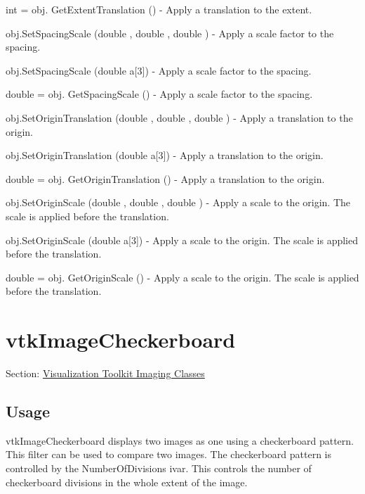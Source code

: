 \begin{DoxyItemize}
\item {\ttfamily int = obj. Get\-Extent\-Translation ()} -\/ Apply a translation to the extent.  
\item {\ttfamily obj.\-Set\-Spacing\-Scale (double , double , double )} -\/ Apply a scale factor to the spacing.  
\item {\ttfamily obj.\-Set\-Spacing\-Scale (double a\mbox{[}3\mbox{]})} -\/ Apply a scale factor to the spacing.  
\item {\ttfamily double = obj. Get\-Spacing\-Scale ()} -\/ Apply a scale factor to the spacing.  
\item {\ttfamily obj.\-Set\-Origin\-Translation (double , double , double )} -\/ Apply a translation to the origin.  
\item {\ttfamily obj.\-Set\-Origin\-Translation (double a\mbox{[}3\mbox{]})} -\/ Apply a translation to the origin.  
\item {\ttfamily double = obj. Get\-Origin\-Translation ()} -\/ Apply a translation to the origin.  
\item {\ttfamily obj.\-Set\-Origin\-Scale (double , double , double )} -\/ Apply a scale to the origin. The scale is applied before the translation.  
\item {\ttfamily obj.\-Set\-Origin\-Scale (double a\mbox{[}3\mbox{]})} -\/ Apply a scale to the origin. The scale is applied before the translation.  
\item {\ttfamily double = obj. Get\-Origin\-Scale ()} -\/ Apply a scale to the origin. The scale is applied before the translation.  
\end{DoxyItemize}\hypertarget{vtkimaging_vtkimagecheckerboard}{}\section{vtk\-Image\-Checkerboard}\label{vtkimaging_vtkimagecheckerboard}
Section\-: \hyperlink{sec_vtkimaging}{Visualization Toolkit Imaging Classes} \hypertarget{vtkwidgets_vtkxyplotwidget_Usage}{}\subsection{Usage}\label{vtkwidgets_vtkxyplotwidget_Usage}
vtk\-Image\-Checkerboard displays two images as one using a checkerboard pattern. This filter can be used to compare two images. The checkerboard pattern is controlled by the Number\-Of\-Divisions ivar. This controls the number of checkerboard divisions in the whole extent of the image.

